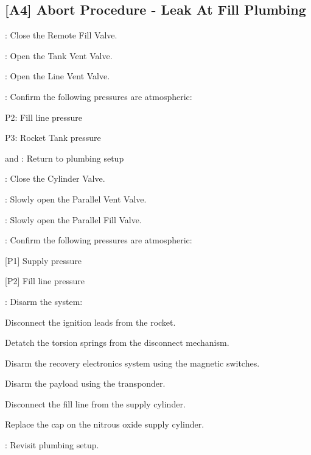\begin{checklist}
\subsection{[A4] Abort Procedure - Leak At Fill Plumbing}
\begin{checklist}
    \item \control{}: Close the Remote Fill Valve.
    \item \control{}: Open the Tank Vent Valve.
    \item \control{}: Open the Line Vent Valve.
    \item \control{}: Confirm the following pressures are atmospheric:
    \begin{checklist}
        \item P2: Fill line pressure
        \item P3: Rocket Tank pressure
    \end{checklist}
    \item \primary{} and \secondary{}: Return to plumbing setup
    \item \primary{}: Close the Cylinder Valve.
    \item \primary{}: Slowly open the Parallel Vent Valve.
    \item \primary{}: Slowly open the Parallel Fill Valve.
    \item \control{}: Confirm the following pressures are atmospheric:
    \begin{checklist}
        \item {[P1]} Supply pressure
        \item {[P2]} Fill line pressure
    \end{checklist}
    \item \primary{}: Disarm the system:
        \begin{checklist}    
            \item Disconnect the ignition leads from the rocket.
            \item Detatch the torsion springs from the disconnect mechanism.
            \item Disarm the recovery electronics system using the magnetic switches.
            \item Disarm the payload using the transponder.
            \item Disconnect the fill line from the supply cylinder.
            \item Replace the cap on the nitrous oxide supply cylinder.
        \end{checklist}
    \item \ops{}: Revisit plumbing setup.
\end{checklist}
\setcounter{checklistnum}{0}


\end{checklist}

